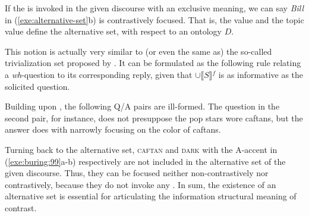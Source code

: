 \noindent If the  is invoked in the given discourse
with an exclusive meaning, we can say \textit{Bill} in
(\ref{exe:alternative-set}b) is 
contrastively focused. That is, the
 value and the topic value define the alternative set, with
respect to an ontology \ensuremath{D}.

This notion is actually very similar to (or even the same as) the
so-called trivialization set proposed by
\citet{buring:99}. It can be formulated as
the following rule relating a \textit{wh}-question to its
corresponding reply, given that \ensuremath{\cup\llbracket S
  \rrbracket}$^{f}$ is as informative as the solicited question.


\noindent Building upon , the following Q/A
pairs are ill-formed. The question in the second pair, for instance,
does not presuppose the pop stars wore caftans, but the answer does
with narrowly focusing on the color of caftans.





\noindent Turning back to the alternative set, \textsc{caftan} and
\textsc{dark} with the A-accent in (\ref{exe:buring:99}a-b)
respectively are not included in the alternative set of the given
discourse. Thus, they can be focused neither
non-contrastively nor contrastively, because they do not invoke any
. In sum, the existence of an alternative set is
essential for articulating the information structural meaning of
contrast.








